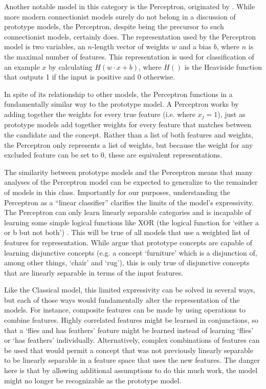 \documentclass[doc,floatsintext]{apa6}
\begin{document}
Another notable model in this category is the Perceptron, originated by \citet{rosenblatt1958}. While more modern connectionist models surely do not belong in a discussion of prototype models, the Perceptron, despite being the precursor to such connectionist models, certainly does. The representation used by the Perceptron model is two variables, an $n$-length vector of weights $w$ and a bias $b$, where $n$ is the maximal number of features. This representation is used for classification of an example $x$ by calculating $H(w\cdot x + b)$, where $H()$ is the Heaviside function that outputs 1 if the input is positive and 0 otherwise.

In spite of its relationship to other models, the Perceptron functions in a fundamentally similar way to the prototype model. A Perceptron works by adding together the weights for every true feature (i.e. where $x_j=1$), just as prototype models add together weights for every feature that matches between the candidate and the concept. Rather than a list of both features and weights, the Perceptron only represents a list  of weights, but because the weight for any excluded feature can be set to $0$, these are equivalent representations.

The similarity between prototype models and the Perceptron means that many analyses of the Perceptron model can be expected to generalize to the remainder of models in this class. Importantly for our purposes, understanding the Perceptron as a ``linear classifier'' clarifies the limits of the model's expressivity. The Perceptron can only learn linearly separable categories and is incapable of learning some simple logical functions like XOR (the logical function for `either a or b but not both') \citep{minskyp1969}.
This will be true of all models that use a weighted list of features for representation.
While \citet{smithm1981} argue that prototype concepts are capable of learning disjunctive concepts (e.g. a concept `furniture' which is a disjunction of, among other things, `chair' and `rug'), this is only true of disjunctive concepts that are linearly separable in terms of the input features.

Like the Classical model, this limited expressivity can be solved in several ways, but each of those ways would fundamentally alter the representation of the models. For instance, composite features can be made by using operations to combine features. 
Highly correlated features might be learned in conjunctions, so that a `flies and has feathers' feature might be learned instead of learning `flies' or `has feathers' individually. 
Alternatively, complex combinations of features can be used that would permit a concept that was not previously linearly separable to be linearly separable in a feature space that uses the new features. 
The danger here is that by allowing additional assumptions to do this much work, the model might no longer be recognizable as the prototype model.
\end{document}
